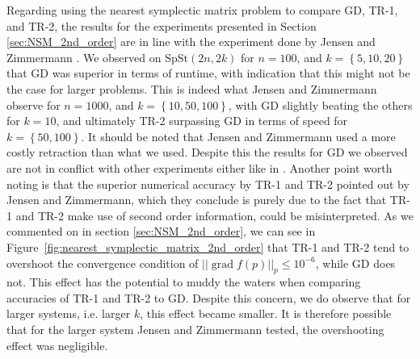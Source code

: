 Regarding using the nearest symplectic matrix problem to compare GD, TR-1, and TR-2, the results for the experiments presented in Section \ref{sec:NSM_2nd_order} are in line with the experiment done by Jensen and Zimmermann \cite[Tbl.~4.1]{JensenZimmermann2024}. We observed on $\mathrm{SpSt}(2n, 2k)$ for $n=100$, and $k=\left\{ 5,10,20 \right\}$ that GD was superior in terms of runtime, with indication that this might not be the case for larger problems. This is indeed what Jensen and Zimmermann observe for $n=1000$, and $k=\left\{ 10,50,100 \right\}$, with GD slightly beating the others for $k=10$, and ultimately TR-2 surpassing GD in terms of speed for $k=\left\{ 50,100 \right\}$. It should be noted that Jensen and Zimmermann used a more costly retraction \cite[Fig.~1]{JensenZimmermann2024} than what we used. Despite this the results for GD we observed are  not in conflict with other experiments either like in \cite[Tbl.~1]{BendokatZimmermann2021}. Another point worth noting is that the superior numerical accuracy by TR-1 and TR-2 pointed out by Jensen and Zimmermann, which they conclude is purely due to the fact that TR-1 and TR-2 make use of second order information, could be misinterpreted. As we commented on in section \ref{sec:NSM_2nd_order}, we can see in Figure~\ref{fig:nearest_symplectic_matrix_2nd_order} that TR-1 and TR-2 tend to overshoot the convergence condition of $\lvert \lvert \operatorname{grad}f(p) \rvert \rvert_{p}\leq10^{-6}$, while GD does not. This effect has the potential to muddy the waters when comparing accuracies of TR-1 and TR-2 to GD. Despite this concern, we do observe that for larger systems, i.e. larger $k$, this effect became smaller. It is therefore possible that for the larger system Jensen and Zimmermann tested, the overshooting effect was negligible.

